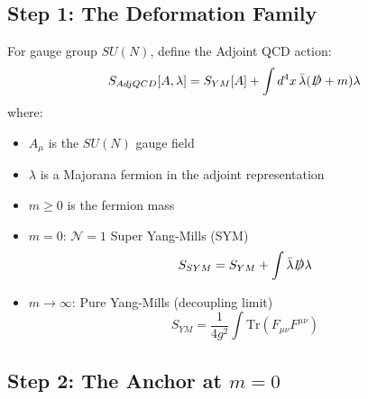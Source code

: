 \subsection{Step 1: The Deformation Family}

\begin{definition}
\label{def:adjoint-qcd-app112}
For gauge group $SU(N)$, define the Adjoint QCD action:
\begin{equation}
S_{AdjQCD}[A, \lambda] = S_{YM}[A] + \int d^4x \, \bar{\lambda} (\slashed{D} + m) \lambda
\end{equation}
where:
\begin{itemize}
\item $A_\mu$ is the $SU(N)$ gauge field
\item $\lambda$ is a Majorana fermion in the adjoint representation
\item $m \geq 0$ is the fermion mass
\end{itemize}
\end{definition}

\begin{definition}
\label{def:limits}
\begin{itemize}
\item \textbf{$m = 0$}: $\mathcal{N}=1$ Super Yang-Mills (SYM)
\begin{equation}
S_{SYM} = S_{YM} + \int \bar{\lambda} \slashed{D} \lambda
\end{equation}
\item \textbf{$m \to \infty$}: Pure Yang-Mills (decoupling limit)
\begin{equation}
S_{YM} = \frac{1}{4g^2} \int \mathrm{Tr}(F_{\mu\nu} F^{\mu\nu})
\end{equation}
\end{itemize}
\end{definition}

\subsection{Step 2: The Anchor at \texorpdfstring{$m = 0$}{m = 0}}

